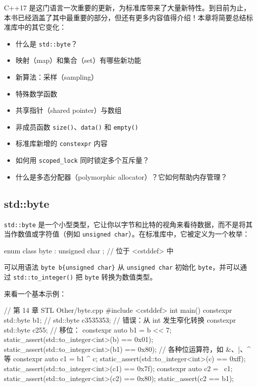 C++17 是这门语言一次重要的更新，为标准库带来了大量新特性。到目前为止，本书已经涵盖了其中最重要的部分，但还有更多内容值得介绍！本章将简要总结标准库中的其它变化：

\begin{itemize}
\item 什么是 \texttt{std::byte}？
\item 映射（map）和集合（set）有哪些新功能
\item 新算法：采样（sampling）
\item 特殊数学函数
\item 共享指针（shared pointer）与数组
\item 非成员函数 \texttt{size()}、\texttt{data()} 和 \texttt{empty()}
\item 标准库新增的 \texttt{constexpr} 内容
\item 如何用 \texttt{scoped\_lock} 同时锁定多个互斥量？
\item 什么是多态分配器（polymorphic allocator）？它如何帮助内存管理？
\end{itemize}


\subsection{std::byte}

\texttt{std::byte} 是一个小型类型，它让你以字节和比特的视角来看待数据，而不是将其当作数值或字符值（例如 \texttt{unsigned char}）。在标准库中，它被定义为一个枚举：

\begin{codebox}[cpp]
enum class byte : unsigned char {} ; // 位于 <cstddef> 中
\end{codebox}

可以用语法 \texttt{byte b\{unsigned char\}} 从 \texttt{unsigned char} 初始化 \texttt{byte}，并可以通过 \texttt{std::to\_integer()} 把 \texttt{byte} 转换为数值类型。

来看一个基本示例：

\begin{codebox}[cpp]
// 第 14 章 STL Other/byte.cpp
#include <cstddef>
int main() {
constexpr std::byte b{1};
// std::byte c{3535353}; // 错误：从 int 发生窄化转换
constexpr std::byte c{255};
// 移位：
constexpr auto b1 = b << 7;
static_assert(std::to_integer<int>(b)
== 0x01);
static_assert(std::to_integer<int>(b1) == 0x80);
// 各种位运算符，如 &、|、^ 等
constexpr auto c1 = b1 ^ c;
static_assert(std::to_integer<int>(c)
== 0xff);
static_assert(std::to_integer<int>(c1) == 0x7f);
constexpr auto c2 = ~c1;
static_assert(std::to_integer<int>(c2)
== 0x80);
static_assert(c2 == b1);
}
\end{codebox}

